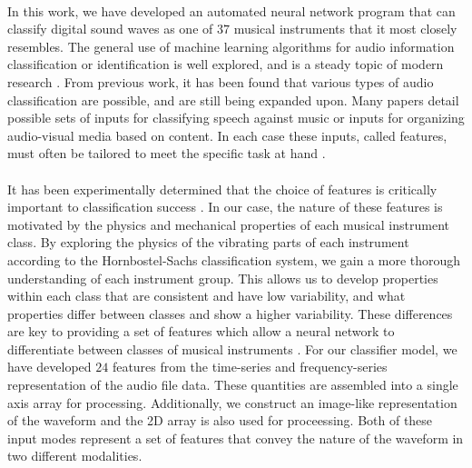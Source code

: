 \documentclass[12pt,letterpaper]{article}
\begin{document}
\paragraph*{}In this work, we have developed an automated neural network program that can classify digital sound waves as one of $37$ musical instruments that it most closely resembles. The general use of machine learning algorithms for audio information classification or identification is well explored, and is a steady topic of modern research \cite{Khan,Liu,Mierswa,Serizel,Zhang}. From previous work, it has been found that various types of audio classification are possible, and are still being expanded upon. Many papers detail possible sets of inputs for classifying speech against music or inputs for organizing audio-visual media based on content. In each case these inputs, called features, must often be tailored to meet the specific task at hand \cite{Virtanen,Liu}.

\paragraph*{}It has been experimentally determined that the choice of features is critically important to classification success \cite{Khan,Mierswa,Serizel}. In our case, the nature of these features is motivated by the physics and mechanical properties of each musical instrument class. By exploring the physics of the vibrating parts of each instrument according to the Hornbostel-Sachs classification system, we gain a more thorough understanding of each instrument group. This allows us to develop properties within each class that are consistent and have low variability, and what properties differ between classes and show a higher variability. These differences are key to providing a set of features which allow a neural network to differentiate between classes of musical instruments \cite{Liu,Zhang}. For our classifier model, we have developed $24$ features from the time-series and frequency-series representation of the audio file data. These quantities are assembled into a single axis array for processing. Additionally, we construct an image-like representation of the waveform and the 2D array is also used for proceessing. Both of these input modes represent a set of features that convey the nature of the waveform in two different modalities.
\end{document}
